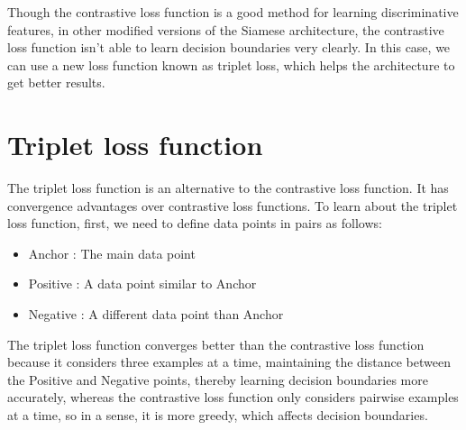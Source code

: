 \documentclass[twoside,twocolumn]{article}
\begin{document}
Though the contrastive loss function is a good method for learning discriminative features, in other modified versions of the Siamese architecture, the contrastive loss function isn't able to learn decision boundaries very clearly.
In this case, we can use a new loss function known as triplet loss, which helps the architecture to get better results.

\section{Triplet loss function}
The triplet loss function is an alternative to the contrastive loss function. It has convergence advantages over contrastive loss functions.
To learn about the triplet loss function, first, we need to define data points in pairs as follows:
\begin{itemize}
    \item Anchor : The main data point
    \item Positive : A data point similar to Anchor
    \item Negative : A different data point than Anchor
\end{itemize}

The triplet loss function converges better than the contrastive loss function because it considers three examples at a time, maintaining the distance between the Positive and Negative points, thereby learning decision boundaries more accurately, whereas the contrastive loss function only considers pairwise examples at a time, so in a sense, it is more greedy, which affects decision boundaries.






\end{document}
